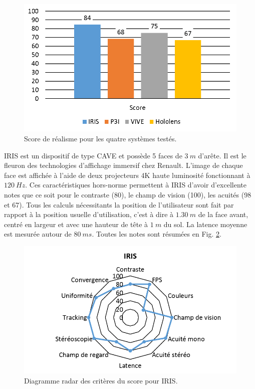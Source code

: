 \begin{figure}
	\centering
	\includegraphics[scale=1]{Figures/ResultatsScoreApplication}
	\caption{Score de réalisme pour les quatre systèmes testés.}
	\label{fig:resultats_score_application}
\end{figure}

\par IRIS est un dispositif de type CAVE et possède 5 faces de $3~m$ d'arête. Il est le fleuron des technologies d'affichage immersif chez Renault. L'image de chaque face est affichée à l'aide de deux projecteurs 4K haute luminosité fonctionnant à $120~Hz$. Ces caractéristiques hors-norme permettent à IRIS d'avoir d'excellente notes que ce soit pour le contraste (80), le champ de vision (100), les acuités (98 et 67). Tous les calculs nécessitants la position de l'utilisateur sont fait par rapport à la position usuelle d'utilisation, c'est à dire à $1.30~m$ de la face avant, centré en largeur et avec une hauteur de tête à $1~m$ du sol. La latence moyenne est mesurée autour de $80~ms$. Toutes les notes sont résumées en Fig. \ref{fig:radar_score_iris}.

\begin{figure}
	\centering
	\includegraphics[scale=1]{Figures/RadarScoreIRIS}
	\caption{Diagramme radar des critères du score pour IRIS.}
	\label{fig:radar_score_iris}
\end{figure}

